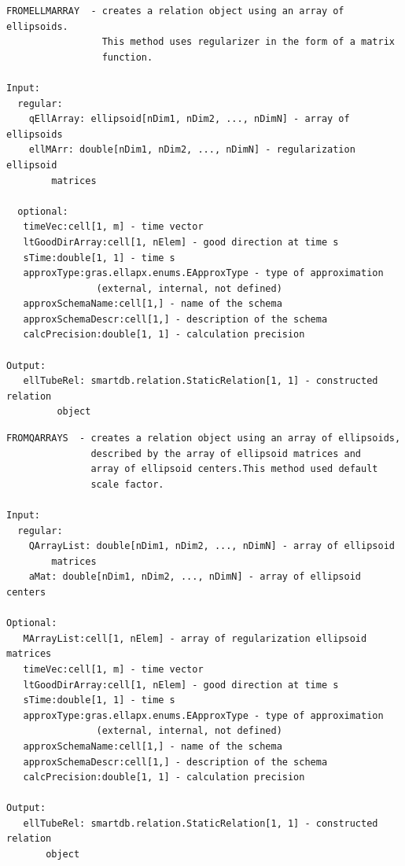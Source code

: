 \documentclass[letterpaper,10pt,english]{sphinxmanual}
\begin{document}
\begin{Verbatim}[commandchars=\\\{\}]
FROMELLMARRAY  - creates a relation object using an array of ellipsoids.
                 This method uses regularizer in the form of a matrix
                 function.

Input:
  regular:
    qEllArray: ellipsoid[nDim1, nDim2, ..., nDimN] - array of ellipsoids
    ellMArr: double[nDim1, nDim2, ..., nDimN] - regularization ellipsoid
        matrices

  optional:
   timeVec:cell[1, m] - time vector
   ltGoodDirArray:cell[1, nElem] - good direction at time s
   sTime:double[1, 1] - time s
   approxType:gras.ellapx.enums.EApproxType - type of approximation
                (external, internal, not defined)
   approxSchemaName:cell[1,] - name of the schema
   approxSchemaDescr:cell[1,] - description of the schema
   calcPrecision:double[1, 1] - calculation precision

Output:
   ellTubeRel: smartdb.relation.StaticRelation[1, 1] - constructed relation
         object
\end{Verbatim}

\begin{Verbatim}[commandchars=\\\{\}]
FROMQARRAYS  - creates a relation object using an array of ellipsoids,
               described by the array of ellipsoid matrices and
               array of ellipsoid centers.This method used default
               scale factor.

Input:
  regular:
    QArrayList: double[nDim1, nDim2, ..., nDimN] - array of ellipsoid
        matrices
    aMat: double[nDim1, nDim2, ..., nDimN] - array of ellipsoid centers

Optional:
   MArrayList:cell[1, nElem] - array of regularization ellipsoid matrices
   timeVec:cell[1, m] - time vector
   ltGoodDirArray:cell[1, nElem] - good direction at time s
   sTime:double[1, 1] - time s
   approxType:gras.ellapx.enums.EApproxType - type of approximation
                (external, internal, not defined)
   approxSchemaName:cell[1,] - name of the schema
   approxSchemaDescr:cell[1,] - description of the schema
   calcPrecision:double[1, 1] - calculation precision

Output:
   ellTubeRel: smartdb.relation.StaticRelation[1, 1] - constructed relation
       object
\end{Verbatim}
\end{document}

